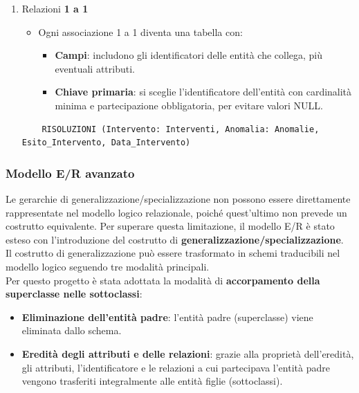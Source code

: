 \begin{enumerate}
    \item Relazioni \textbf{1 a 1}
    \begin{itemize}
        \item Ogni associazione 1 a 1 diventa una tabella con:
        \begin{itemize}
            \item \textbf{Campi}: includono gli identificatori delle entità che collega, più eventuali attributi.
            \item \textbf{Chiave primaria}: si sceglie l’identificatore dell’entità con cardinalità minima e partecipazione obbligatoria, per evitare valori NULL.
        \end{itemize}
    \end{itemize}
    \begin{lstlisting}
    RISOLUZIONI (Intervento: Interventi, Anomalia: Anomalie, Esito_Intervento, Data_Intervento)
    \end{lstlisting}
\end{enumerate}

\subsubsection{Modello E/R avanzato}

Le gerarchie di generalizzazione/specializzazione non possono essere direttamente rappresentate nel modello logico relazionale, poiché quest'ultimo non prevede un costrutto equivalente. Per superare questa limitazione, il modello E/R è stato esteso con l'introduzione del costrutto di \textbf{generalizzazione/specializzazione}. \\

\noindent
Il costrutto di generalizzazione può essere trasformato in schemi traducibili nel modello logico seguendo tre modalità principali.\\

\noindent
Per questo progetto è stata adottata la modalità di \textbf{accorpamento della superclasse nelle sottoclassi}:
\begin{itemize}
    \item \textbf{Eliminazione dell’entità padre}: l'entità padre (superclasse) viene eliminata dallo schema.
    \item \textbf{Eredità degli attributi e delle relazioni}: grazie alla proprietà dell’eredità, gli attributi, l’identificatore e le relazioni a cui partecipava l’entità padre vengono trasferiti integralmente alle entità figlie (sottoclassi).
\end{itemize}

